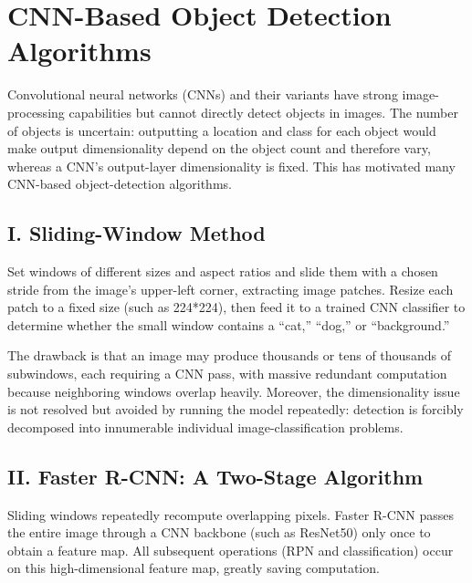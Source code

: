 \setcounter{section}{5}

\hypertarget{cnn-based-object-detection-algorithms}{%
\section{CNN-Based Object Detection Algorithms}\label{cnn-based-object-detection-algorithms}}

Convolutional neural networks (CNNs) and their variants have strong image-processing capabilities but cannot directly detect objects in images. The number of objects is uncertain: outputting a location and class for each object would make output dimensionality depend on the object count and therefore vary, whereas a CNN's output-layer dimensionality is fixed. This has motivated many CNN-based object-detection algorithms.

\hypertarget{i.-sliding-window-method}{%
\subsection{I. Sliding-Window Method}\label{i.-sliding-window-method}}

Set windows of different sizes and aspect ratios and slide them with a chosen stride from the image's upper-left corner, extracting image patches. Resize each patch to a fixed size (such as 224*224), then feed it to a trained CNN classifier to determine whether the small window contains a ``cat,'' ``dog,'' or ``background.''

The drawback is that an image may produce thousands or tens of thousands of subwindows, each requiring a CNN pass, with massive redundant computation because neighboring windows overlap heavily. Moreover, the dimensionality issue is not resolved but avoided by running the model repeatedly: detection is forcibly decomposed into innumerable individual image-classification problems.

\hypertarget{ii.-faster-r-cnn-a-two-stage-algorithm}{%
\subsection{II. Faster R-CNN: A Two-Stage Algorithm}\label{ii.-faster-r-cnn-a-two-stage-algorithm}}

Sliding windows repeatedly recompute overlapping pixels. Faster R-CNN passes the entire image through a CNN backbone (such as ResNet50) only once to obtain a feature map. All subsequent operations (RPN and classification) occur on this high-dimensional feature map, greatly saving computation.

